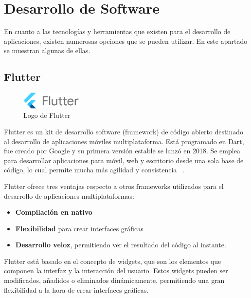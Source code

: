 \newpage



\section{Desarrollo de Software}
En cuanto a las tecnologías y herramientas que existen para el desarrollo de aplicaciones, 
existen numerosas opciones que se pueden utilizar. En este apartado se muestran algunas de ellas.

\subsection{Flutter}
\begin{figure}
\vspace*{-0.4cm}
\centering
\includegraphics[width=0.27\textwidth]{imagenes/c2/flutter.png}

\caption{Logo de Flutter}
\end{figure}Flutter es un kit de desarrollo software (framework) de código abierto destinado al desarrollo de aplicaciones móviles multiplataforma. Está programado en Dart, fue creado por Google y su primera versión estable se lanzó en 2018.
Se emplea para desarrollar aplicaciones para móvil, web y escritorio desde una sola base de código, lo cual permite mucha más agilidad y consistencia ~\cite{flutter}. 

Flutter ofrece tres ventajas respecto a otros frameworks utilizados para el desarrollo de aplicaciones multiplataformas:

\begin{itemize}
\item \textbf{Compilación en nativo}
\item \textbf{Flexibilidad} para crear interfaces gráficas
\item \textbf{Desarrollo veloz}, permitiendo ver el resultado del código al instante.

\end{itemize}
Flutter está basado en el concepto de widgets, que son los elementos que componen la interfaz y la interacción del usuario. Estos widgets pueden ser modificados, añadidos o eliminados
dinámicamente, permitiendo una gran flexibilidad a la hora de crear interfaces gráficas. 

